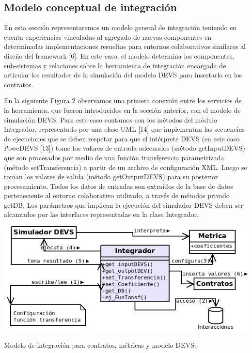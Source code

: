 \subsection{Modelo conceptual de integración}

En esta sección representaremos un modelo general de integración teniendo en
cuenta experiencias vinculadas al agregado de nuevas componentes en determinadas
implementaciones resueltas para entornos colaborativos similares al diseño del
framework [6]. En este caso, el modelo determina los componentes, sub-sistemas y
relaciones sobre la herramienta de integración encargada de articular los
resultados de la simulación del modelo DEVS para insertarlo en los contratos. 


En la siguiente Figura 2 observamos una primera conexión entre los servicios de
la herramienta, que fueron introducidos en la sección anterior, con el modelo de
simulación DEVS. Para este caso contamos con los métodos del módulo Integrador, 
representado por una clase UML [14] que implementan las secuencias de
ejecuciones que se deben respetar para que el intérprete DEVS (en este caso
PoweDEVS [13])  tome los valores de entrada adecuados (método getInputDEVS) que
son procesados por medio de una función transferencia parametrizada (método
setTransferencia) a partir de un archivo de configuración XML. Luego se toman
los valores de salida (método getOutputDEVS) para su posterior procesamiento.
Todos los datos de entradas son extraídos de la base de datos perteneciente al
entorno colaborativo utilizado, a través de métodos privado getDB. Los
parámetros que implican la ejecución del simulador DEVS deben ser alcanzados por
las interfaces representadas en la clase Integrador. 


\begin{center}
 \includegraphics[width=5 in,totalheight=4 in] {Ch9/f12}
\end{center}
\caption{Modelo de integración para contratos, métricas y modelo DEVS.}

